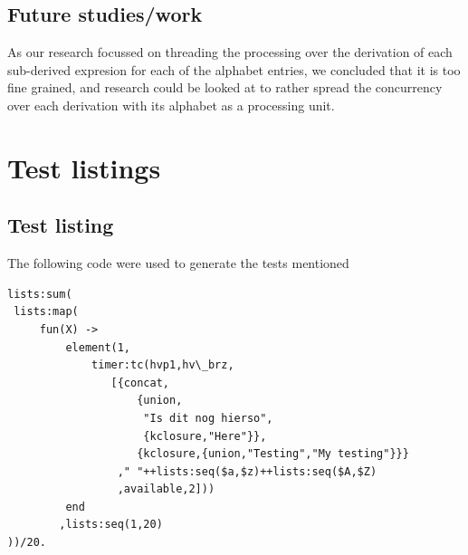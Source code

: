 \documentclass[a4paper,11pt]{report}
\begin{document}
\section{Future studies/work }

As our research focussed on threading the processing over the
derivation of each sub-derived expresion for each of the alphabet
entries, we concluded that it is too fine grained, and research could
be looked at to rather spread the concurrency over each derivation
with its alphabet as a processing unit.




\appendix
\chapter{Test listings}

\section{Test listing}

The following code were used to generate the tests mentioned

\begin{lstlisting}
lists:sum(
 lists:map(
	 fun(X) -> 
		 element(1,
			 timer:tc(hvp1,hv\_brz,
				[{concat,
					{union,
					 "Is dit nog hierso",
					 {kclosure,"Here"}},
					{kclosure,{union,"Testing","My testing"}}}
				 ," "++lists:seq($a,$z)++lists:seq($A,$Z)
				 ,available,2]))
		 end
		,lists:seq(1,20)
))/20. 
\end{lstlisting}
\end{document}
